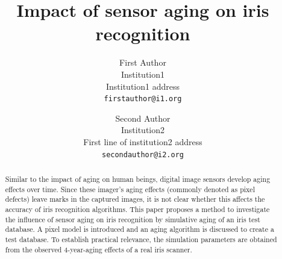 \documentclass[10pt,twocolumn,letterpaper]{article}
\begin{document}
\title{Impact of sensor aging on iris recognition}

\author{First Author\\
Institution1\\
Institution1 address\\
{\tt\small firstauthor@i1.org}
\and
Second Author\\
Institution2\\
First line of institution2 address\\
{\tt\small secondauthor@i2.org}
}

\maketitle
\thispagestyle{empty}

\begin{abstract}
   Similar to the impact of aging on human beings, digital image sensors develop aging effects over time. Since these imager's aging effects (commonly denoted as pixel defects) leave marks in the captured images, it is not clear whether this affects the accuracy of iris recognition algorithms. This paper proposes a method to investigate the influence of sensor aging on iris recognition by simulative aging of an iris test database. A pixel model is introduced and an aging algorithm is discussed to create a test database. To establish practical relevance, the simulation parameters are obtained from the observed 4-year-aging effects of a real iris scanner.
\end{abstract}

\end{document}
